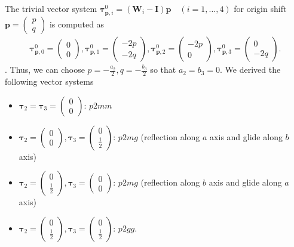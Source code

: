 The trivial vector system $\bm{\tau}^{0}_{\bm{p}, i} = (\bm{W}_{i} - \bm{I}) \bm{p} \quad (i=1,\dots,4)$ for origin shift $\bm{p} = \begin{pmatrix} p \\ q \end{pmatrix}$ is computed as
\begin{align*}
  \bm{\tau}^{0}_{\bm{p}, 0} = \begin{pmatrix} 0 \\ 0 \end{pmatrix},
  \bm{\tau}^{0}_{\bm{p}, 1} = \begin{pmatrix} -2 p \\ -2 q \end{pmatrix},
  \bm{\tau}^{0}_{\bm{p}, 2} = \begin{pmatrix} -2 p \\ 0 \end{pmatrix},
  \bm{\tau}^{0}_{\bm{p}, 3} = \begin{pmatrix} 0 \\ -2 q \end{pmatrix}.
\end{align*}.
Thus, we can choose $p=-\frac{a_{2}}{2}, q=-\frac{b_{3}}{2}$ so that $a_{2} = b_{3} = 0$.
We derived the following vector systems
\begin{itemize}
  \item $\bm{\tau}_{2} = \bm{\tau}_{3} = \begin{pmatrix} 0 \\ 0 \end{pmatrix}$: $p2mm$
  \item $\bm{\tau}_{2} = \begin{pmatrix} 0 \\ 0 \end{pmatrix}, \bm{\tau}_{3} = \begin{pmatrix} 0 \\ \frac{1}{2} \end{pmatrix}$: $p2mg$ (reflection along $a$ axis and glide along $b$ axis)
  \item $\bm{\tau}_{2} = \begin{pmatrix} 0 \\ \frac{1}{2} \end{pmatrix}, \bm{\tau}_{3} = \begin{pmatrix} 0 \\ 0 \end{pmatrix}$: $p2mg$ (reflection along $b$ axis and glide along $a$ axis)
  \item $\bm{\tau}_{2} = \begin{pmatrix} 0 \\ \frac{1}{2} \end{pmatrix}, \bm{\tau}_{3} = \begin{pmatrix} 0 \\ \frac{1}{2} \end{pmatrix}$: $p2gg$.
\end{itemize}

